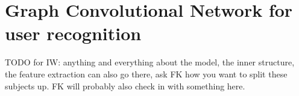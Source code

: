
\chapter{Graph Convolutional Network for user recognition}

TODO for IW: anything and everything about the model, the inner structure, the feature extraction can also go there, ask FK how you want to split these subjects up. FK will probably also check in with something here.